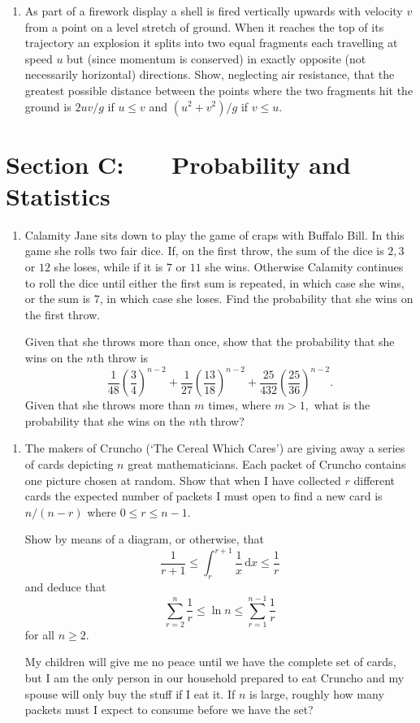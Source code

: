 \documentclass[a4, 11pt]{report}
\newlength{\qspace}
\newcounter{qnumber}
\newenvironment{question}%
 {\vspace{\qspace}
  \begin{enumerate}[\bfseries 1\quad][10]%
    \setcounter{enumi}{\value{qnumber}}%
    \item%
 }
{
  \end{enumerate}
  \filbreak
  \stepcounter{qnumber}
 }
\begin{document}

\begin{question}
As part of a firework display a shell is fired vertically upwards
with velocity $v$ from a point on a level stretch of ground. When
it reaches the top of its trajectory an explosion it splits into two
equal fragments each travelling at speed $u$ but (since momentum
is conserved) in exactly opposite (not necessarily horizontal) directions.
Show, neglecting air resistance, that the greatest possible distance
between the points where the two fragments hit the ground is $2uv/g$
if $u\leqslant v$ and $(u^{2}+v^{2})/g$ if $v\leqslant u.$ 
\end{question}
	

	
	\newpage
\section*{Section C: \ \ \ Probability and Statistics}


\begin{question}
Calamity Jane sits down to play the game of craps with Buffalo Bill.
In this game she rolls two fair dice. If, on the first throw, the
sum of the dice is $2,3$ or $12$ she loses, while if it is $7$
or $11$ she wins. Otherwise Calamity continues to roll the dice until
either the first sum is repeated, in which case she wins, or the sum
is $7$, in which case she loses. Find the probability that she wins
on the first throw. 


Given that she throws more than once, show that the probability that
she wins on the $n$th throw is 
\[
\frac{1}{48}\left(\frac{3}{4}\right)^{n-2}+\frac{1}{27}\left(\frac{13}{18}\right)^{n-2}+\frac{25}{432}\left(\frac{25}{36}\right)^{n-2}.
\]
Given that she throws more than $m$ times, where $m>1,$ what is
the probability that she wins on the $n$th throw?
\end{question}

\begin{question}
The makers of Cruncho (`The Cereal Which Cares') are giving away a
series of cards depicting $n$ great mathematicians. Each packet of
Cruncho contains one picture chosen at random. Show that when I have
collected $r$ different cards the expected number of packets I must
open to find a new card is $n/(n-r)$ where $0\leqslant r\leqslant n-1.$


Show by means of a diagram, or otherwise, that 
\[
\frac{1}{r+1}\leqslant\int_{r}^{r+1}\frac{1}{x}\,\mathrm{d}x\leqslant\frac{1}{r}
\]
and deduce that 
\[
\sum_{r=2}^{n}\frac{1}{r}\leqslant\ln n\leqslant\sum_{r=1}^{n-1}\frac{1}{r}
\]
for all $n\geqslant2.$ 


My children will give me no peace until we have the complete set of
cards, but I am the only person in our household prepared to eat Cruncho
and my spouse will only buy the stuff if I eat it. If $n$ is large,
roughly how many packets must I expect to consume before we have the
set?
\end{question}
\end{document}
